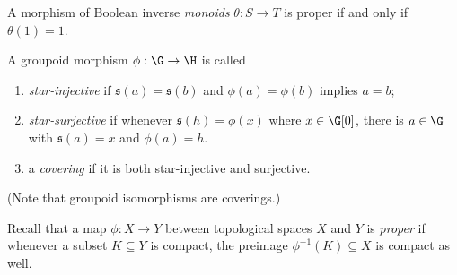 \begin{example}
A morphism of Boolean inverse \emph{monoids} $\theta:S\to T$ is proper if and only if $\theta(1)=1$.
\end{example}
\begin{definition}
A groupoid morphism $\phi:\G\to\H$ is called
\begin{enumerate}
\item \emph{star-injective} if $\mathfrak{s}(a)=\mathfrak{s}(b)$ and $\phi(a)=\phi(b)$ implies $a=b$;
\item \emph{star-surjective} if whenever $\mathfrak{s}(h)=\phi(x)$ where $x\in\G[0]$, there is $a\in\G$ with $\mathfrak{s}(a)=x$ and $\phi(a)=h$.
\item a \emph{covering} if it is both star-injective and surjective.
\end{enumerate}
(Note that groupoid isomorphisms are coverings.)
\end{definition}
 
Recall that a map $\phi:X\to Y$ between topological spaces $X$ and $Y$ is \emph{proper} if whenever a subset $K\subseteq Y$ is compact, the preimage $\phi^{-1}(K)\subseteq X$ is compact as well.
 
